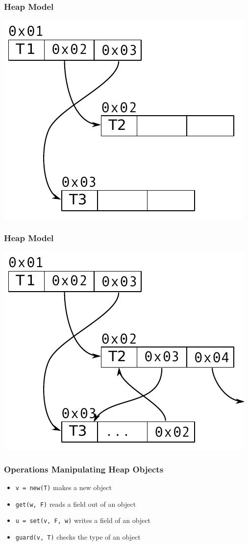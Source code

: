 \documentclass[utf8x]{beamer}
\begin{document}
\begin{frame}
  \frametitle{Heap Model}
  \includegraphics[scale=0.9]{figures/heap02}
\end{frame}

\begin{frame}
  \frametitle{Heap Model}
  \includegraphics[scale=0.9]{figures/heap03}
\end{frame}

\begin{frame}
  \frametitle{Operations Manipulating Heap Objects}
  \begin{itemize}
      \item \texttt{v = new(T)} makes a new object
      \item \texttt{get(w, F)} reads a field out of an object
      \item \texttt{u = set(v, F, w)} writes a field of an object
      \item \texttt{guard(v, T)} checks the type of an object
  \end{itemize}
\end{frame}
\end{document}
